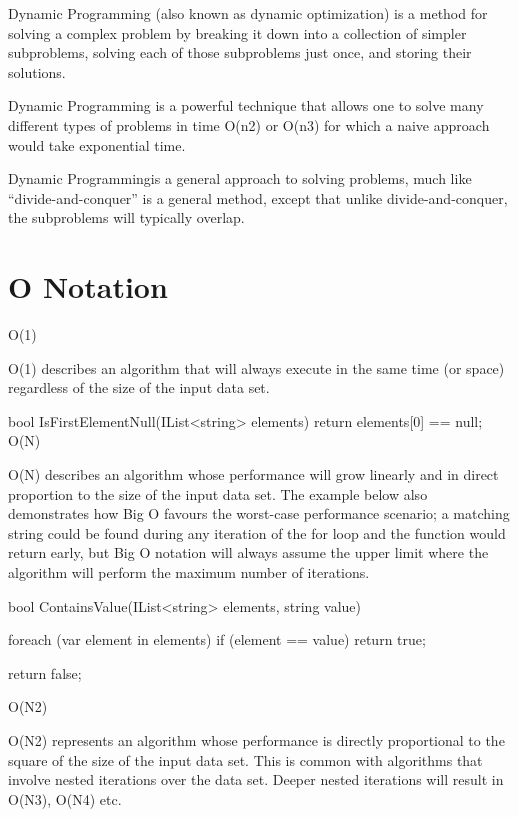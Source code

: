 

Dynamic Programming (also known as dynamic optimization) is a method for solving a complex problem by breaking it down into a collection of simpler subproblems, solving each of those subproblems just once, and storing their solutions.

Dynamic Programming is a powerful technique that allows one to solve many different types of
problems in time O(n2) or O(n3) for which a naive approach would take exponential time. 

Dynamic Programmingis a general approach to solving problems, much like “divide-and-conquer” is a general
method, except that unlike divide-and-conquer, the subproblems will typically overlap.


\section{O Notation}

O(1)

O(1) describes an algorithm that will always execute in the same time (or space) regardless of the size of the input data set.

bool IsFirstElementNull(IList<string> elements)
{
    return elements[0] == null;
}
O(N)

O(N) describes an algorithm whose performance will grow linearly and in direct proportion to the size of the input data set. The example below also demonstrates how Big O favours the worst-case performance scenario; a matching string could be found during any iteration of the for loop and the function would return early, but Big O notation will always assume the upper limit where the algorithm will perform the maximum number of iterations.

bool ContainsValue(IList<string> elements, string value)
{
    foreach (var element in elements)
    {
        if (element == value) return true;
    }

    return false;
}
O(N2)

O(N2) represents an algorithm whose performance is directly proportional to the square of the size of the input data set. This is common with algorithms that involve nested iterations over the data set. Deeper nested iterations will result in O(N3), O(N4) etc.

